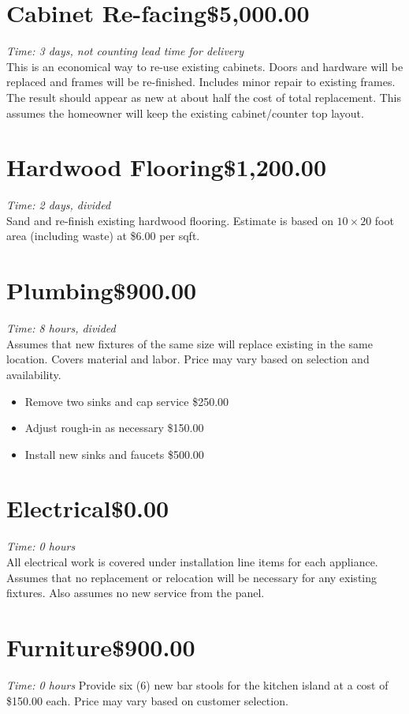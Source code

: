 \documentclass[letterpaper,10pt]{article}
\begin{document}
\section{Cabinet Re-facing\dotfill\$5,000.00}
\emph{Time: 3 days, not counting lead time for delivery} \\
This is an economical way to re-use existing cabinets.  Doors and hardware will be replaced and frames will be re-finished.  Includes minor repair to existing frames.  The result should appear as new at about half the cost of total replacement.  This assumes the homeowner will keep the existing cabinet/counter top layout.

\section{Hardwood Flooring\dotfill\$1,200.00}
\emph{Time: 2 days, divided} \\
Sand and re-finish existing hardwood flooring.  Estimate is based on $10\times20$ foot area (including waste) at \$6.00 per sqft.  

\section{Plumbing\dotfill\$900.00}
\emph{Time: 8 hours, divided} \\
Assumes that new fixtures of the same size will replace existing in the same location.  Covers material and labor.  Price may vary based on selection and availability.
\begin{itemize}
	\item Remove two sinks and cap service \dotfill\$250.00
	\item Adjust rough-in as necessary \dotfill\$150.00
	\item Install new sinks and faucets \dotfill\$500.00
\end{itemize}

\section{Electrical\dotfill\$0.00}
\emph{Time: 0 hours} \\
All electrical work is covered under installation line items for each appliance.  Assumes that no replacement or relocation will be necessary for any existing fixtures.  Also assumes no new service from the panel.

\section{Furniture\dotfill\$900.00}
\emph{Time: 0 hours}
Provide six (6) new bar stools for the kitchen island at a cost of \$150.00 each.  Price may vary based on customer selection.
\end{document}
